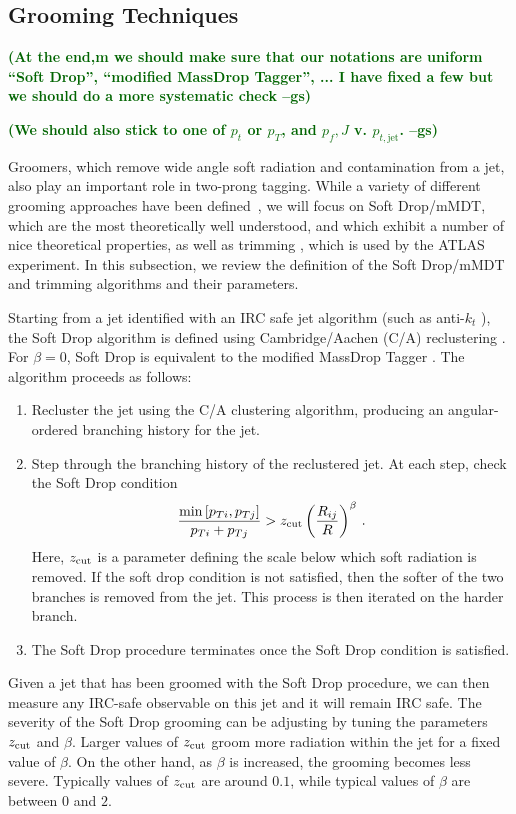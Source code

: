 \documentclass[11pt,letterpaper]{article}
\newcommand{\zcut}{z_{\rm cut}}
\newcommand{\gs}[1]{\textbf{\textcolor{darkgreen}{(#1 --gs)}}}
\begin{document}
\subsection{Grooming Techniques}\label{sec:groom_tech}

\gs{At the end,m we should make sure that our notations are uniform
  ``Soft Drop'', ``modified MassDrop Tagger'', ... I have fixed a few
  but we should do a more systematic check}

\gs{We should also stick to one of $p_t$ or $p_T$, and $p_f,J$
  v. $p_{t,\text{jet}}$.}

Groomers, which remove wide angle soft radiation and contamination from a jet, also play an important role in two-prong tagging.
%
While a variety of different grooming approaches have been defined~\cite{Butterworth:2008iy,Ellis:2009su,Ellis:2009me,Krohn:2009th,Dasgupta:2013via,Dasgupta:2013ihk}, we will focus on Soft Drop/mMDT, which are the most theoretically well understood, and which exhibit a number of nice theoretical properties, as well as trimming \cite{Krohn:2009th}, which is used by the ATLAS experiment.
%
In this subsection, we review the definition of the Soft Drop/mMDT and trimming algorithms and their parameters.

Starting from a jet identified with an IRC safe jet algorithm (such as
anti-$k_t$ \cite{Cacciari:2008gp}), the Soft Drop algorithm is defined
using Cambridge/Aachen (C/A) reclustering
\cite{Dokshitzer:1997in,Wobisch:1998wt,Wobisch:2000dk}.
%
For $\beta = 0$, Soft Drop is equivalent to the modified MassDrop Tagger \cite{Dasgupta:2013ihk}.
%
The algorithm proceeds as follows:
%
\begin{enumerate}
%
\item Recluster the jet using the C/A clustering algorithm, producing an angular-ordered branching history for the jet.
%
\item Step through the branching history of the reclustered jet.  At each step, check the Soft Drop condition
\begin{align}\label{eq:sd_cut}
\frac{\min\left[ p_{Ti}, p_{Tj}  \right]}{p_{Ti}+p_{Tj}}> \zcut \left(   \frac{R_{ij}}{R}\right)^\beta \,.
\end{align}
Here, $\zcut$ is a parameter defining the scale below which soft radiation is removed.  If the soft drop condition is not satisfied, then the softer of the two branches is removed from the jet.  This process is then iterated on the harder branch.
%
\item The Soft Drop procedure terminates once the Soft Drop condition is satisfied.
%
\end{enumerate}
%
Given a jet that has been groomed with the Soft Drop procedure, we can
then measure any IRC-safe observable on this jet and it will remain
IRC safe.
%
The severity of the Soft Drop grooming can be adjusting by
tuning the parameters $\zcut$ and $\beta$.
%
Larger values of $\zcut$ groom more radiation within the jet for a fixed value of $\beta$.
%
On the other hand, as $\beta$ is increased, the grooming becomes less
severe.
%
Typically values of $\zcut$ are around $0.1$, while typical
values of $\beta$ are between $0$ and $2$.
\end{document}

